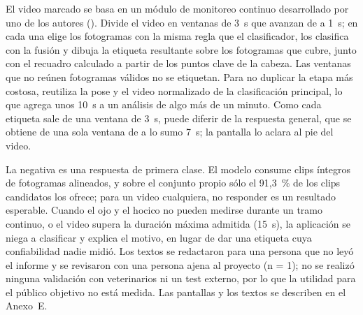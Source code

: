 El video marcado se basa en un módulo de monitoreo continuo desarrollado por uno de los autores (). Divide el video en ventanas de 3~s que avanzan de a 1~s; en cada una elige los \Fotogramas{} fotogramas con la misma regla que el clasificador, los clasifica con la fusión y dibuja la etiqueta resultante sobre los fotogramas que cubre, junto con el recuadro calculado a partir de los puntos clave de la cabeza. Las ventanas que no reúnen \Fotogramas{} fotogramas válidos no se etiquetan. Para no duplicar la etapa más costosa, reutiliza la pose y el video normalizado de la clasificación principal, lo que agrega unos 10~s a un análisis de algo más de un minuto. Como cada etiqueta sale de una ventana de 3~s, puede diferir de la respuesta general, que se obtiene de una sola ventana de a lo sumo 7~s; la pantalla lo aclara al pie del video.

La negativa es una respuesta de primera clase. El modelo consume clips íntegros de \Fotogramas{} fotogramas alineados, y sobre el conjunto propio sólo el 91,3~\% de los clips candidatos los ofrece; para un video cualquiera, no responder es un resultado esperable. Cuando el ojo y el hocico no pueden medirse durante un tramo continuo, o el video supera la duración máxima admitida (15~s), la aplicación se niega a clasificar y explica el motivo, en lugar de dar una etiqueta cuya confiabilidad nadie midió. Los textos se redactaron para una persona que no leyó el informe y se revisaron con una persona ajena al proyecto (n = 1); no se realizó ninguna validación con veterinarios ni un test externo, por lo que la utilidad para el público objetivo no está medida. Las pantallas y los textos se describen en el Anexo~E.
